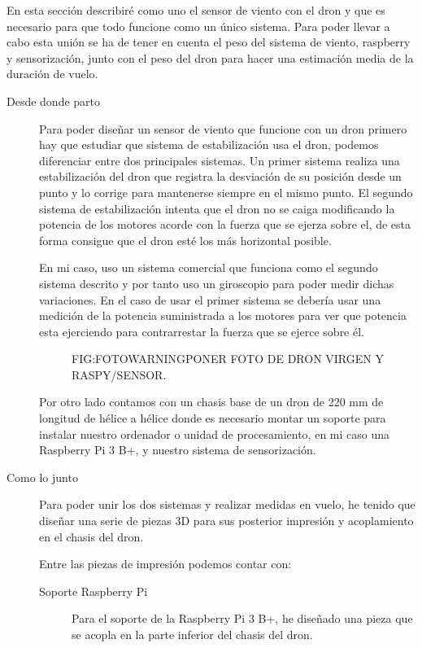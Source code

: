 
En esta sección describiré como uno el sensor de viento con el dron y que es necesario para que todo funcione como un único sistema.
Para poder llevar a cabo esta unión se ha de tener en cuenta el peso del sistema de viento, raspberry y sensorización, junto con el peso del dron para hacer una estimación media de la duración de vuelo.


\begin{description}
\item[Desde donde parto]
Para poder diseñar un sensor de viento que funcione con un dron primero hay que estudiar que sistema de estabilización usa el dron, podemos diferenciar entre dos principales sistemas. Un primer sistema realiza una estabilización del dron que registra la desviación de su posición desde un punto y lo corrige para mantenerse siempre en el mismo punto. El segundo sistema de estabilización intenta que el dron no se caiga modificando la potencia de los motores acorde con la fuerza que se ejerza sobre el, de esta forma consigue que el dron esté los más horizontal posible.

En mi caso, uso un sistema comercial que funciona como el segundo sistema descrito y por tanto uso un giroscopio para poder medir dichas variaciones. En el caso de usar el primer sistema se debería usar una medición de la potencia suministrada a los motores para ver que potencia esta ejerciendo para contrarrestar la fuerza que se ejerce sobre él.

  \begin{figure}{FIG:FOTOWARNING}{PONER FOTO DE DRON VIRGEN Y RASPY/SENSOR.}
\end{figure}

Por otro lado contamos con un chasis base de un dron de 220 mm de longitud de hélice a hélice donde es necesario montar un soporte para instalar nuestro ordenador o unidad de procesamiento, en mi caso una Raspberry Pi 3 B+, y nuestro sistema de sensorización.

\item[Como lo junto] Para poder unir los dos sistemas y realizar medidas en vuelo, he tenido que diseñar una serie de piezas 3D para sus posterior impresión y acoplamiento en el chasis del dron.

Entre las piezas de impresión podemos contar con:
\begin{description}
\item[Soporte Raspberry Pi]
Para el soporte de la Raspberry Pi 3 B+, he diseñado una pieza que se acopla en la parte inferior del chasis del dron. 


\end{description}
\end{description}
